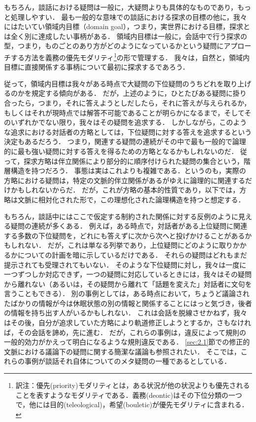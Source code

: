 \documentclass{goken}
\newcommand{\term}[2]{\textsf{#1}（#2）}
\newcommand{\ori}[1]{\noindent\textcolor[gray]{0.7}{\fontsize{8pt}{8pt}\selectfont{\textsf{(p.~#1)}}} }
\begin{document}
もちろん，談話における疑問は一般に，大疑問よりも具体的なものであり，もっと処理しやすい．
最も一般的な意味での談話における探求の目標の他に，我々にはたいてい\term{領域内目標}{domain goal}，つまり，実世界における目標，探求とは全く別に達成したい事柄がある．
\renewcommand{\thefootnote}{\fnsymbol{footnote}}
\setcounter{footnote}{0}
領域内目標は一般に，会話中で行う探求の型，つまり，ものごとのあり方がどのようになっているかという疑問にアプローチする方法を義務の優先モダリティ\footnote{訳注：優先(priority)モダリティとは，ある状況が他の状況よりも優先されることを表すようなモダリティである．義務(deontic)はその下位分類の一つで，他には目的(teleological)，希望(bouletic)が優先モダリティに含まれる．}の形で管理する．
我々は，自然と，領域内目標に直接関係する事柄について最初に探求するであろう．
\renewcommand{\thefootnote}{\arabic{footnote}~}
\setcounter{footnote}{7}

従って，領域内目標は我々がある時点で大疑問の下位疑問のうちどれを取り上げるのかを規定する傾向がある．
だが，上述のように，ひとたびある疑問に掛り合ったら，つまり，それに答えようとしだしたら，それに答えが与えられるか，もしくはそれが現時点では解答不可能であることが明らかになるまで，そしてそのいずれかでない限り，我々はその疑問を追求する．
しかしながら，このような追求における対話者の方略としては，下位疑問に対する答えを追求するという決定もあるだろう．
つまり，関連する疑問の連続がその中で最も一般的で論理的に最も強い疑問に対する答えを得るための方略となるかもしれないのだ．
従って，探求方略は伴立関係により部分的に順序付けられた疑問の集合という，階層構造を持つだろう．
事態は実はこれよりも複雑である．というのも，実際の方略における疑問は，特定の文脈的伴立関係があるがゆえに論理的に関連するだけかもしれないからだ．
だが，これが方略の基本的性質であり，以下では，方略は文脈に相対化された形で，この理想化された論理構造を持つと想定する．

もちろん，談話中にはここで仮定する制約された関係に対する反例のように見える疑問の連続が多くある．
例えば，ある時点で，対話者がある上位疑問に関連する多数の下位疑問を，どれにも答えずに次から次へと投げかけることがあるかもしれない．
だが，これは単なる列挙であり，上位疑問にどのように取りかかるかについての計画を暗に示しているだけである．
\ori{8}
それらの疑問はどれもまだ提示されても受理されてもいない．
そのような下位疑問に対し，我々は一度に一つずつしか対応できず，一つの疑問に対応しているときには，我々はその疑問から離れない（あるいは，その疑問から離れて「話題を変えた」対話者に文句を言うこともできる）．
別の事例としては，ある時点において，ちょうど議論されたばかりの情報が今は休眠状態の別の情報と関係することにはっと気づき，後者の情報を持ち出す人がいるかもしれない．
これは会話を脱線させかねず，我々はその後，自分が追求していた方略により軌道修正しようとするか，さもなければ，その会話を諦め，先に進む．
だが，これらの事例は，違反によって規則の一般的効力がかえって明白になるような規則違反である．
\ref{sec:2.1}節での修正的文脈における議論下の疑問に関する簡潔な議論も参照されたい．
そこでは，これらの事例が談話それ自体についてのメタ疑問の一種であるとしている．
\end{document}
